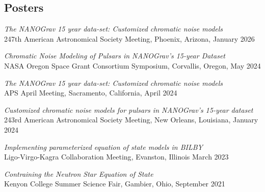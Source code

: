 \documentclass[11pt,letterpaper,sans,unicode]{moderncv}
\newcommand{\talkitem}[3]{\item \textit{#1}\\{#2}, #3} %
\begin{document}
{\subsection{Posters}
\begin{etaremune}[leftmargin=8mm]
\small
\talkitem{The NANOGrav 15 year data-set: Customized chromatic noise models}{247th American Astronomical Society Meeting}{Phoenix, Arizona, January 2026}
\talkitem{Chromatic Noise Modeling of Pulsars in NANOGrav's 15-year Dataset}{NASA Oregon Space Grant Consortium Symposium}{Corvallis, Oregon, May 2024}
\talkitem{The NANOGrav 15 year data-set: Customized chromatic noise models}{APS April Meeting}{Sacramento, California, April 2024}
\talkitem{Customized chromatic noise models for pulsars in NANOGrav's 15-year dataset}{243rd American Astronomical Society Meeting}{New Orleans, Louisiana, January 2024}
\talkitem{Implementing parameterized equation of state models in BILBY}{Ligo-Virgo-Kagra Collaboration Meeting}{Evanston, Illinois March 2023}
\talkitem{Contraining the Neutron Star Equation of State}{Kenyon College Summer Science Fair}{Gambier, Ohio, September 2021}
\end{etaremune}


}
\end{document}
